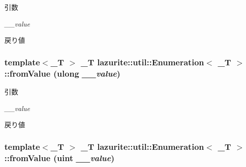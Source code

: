 \begin{DoxyParams}{引数}
\item[{\em \_\-\_\-value}]\end{DoxyParams}
\begin{DoxyReturn}{戻り値}

\end{DoxyReturn}
\hypertarget{classlazurite_1_1util_1_1_enumeration_3_01___t_01_4_a3032515b693fa3804c848efd7fea3cd7}{
\subsubsection[{fromValue}]{\setlength{\rightskip}{0pt plus 5cm}template$<$\_\-T $>$ \_\-T lazurite::util::Enumeration$<$ \_\-T $>$::fromValue (ulong {\em \_\-\_\-value})}}
\label{classlazurite_1_1util_1_1_enumeration_3_01___t_01_4_a3032515b693fa3804c848efd7fea3cd7}

\begin{DoxyParams}{引数}
\item[{\em \_\-\_\-value}]\end{DoxyParams}
\begin{DoxyReturn}{戻り値}

\end{DoxyReturn}
\hypertarget{classlazurite_1_1util_1_1_enumeration_3_01___t_01_4_aff6ca33e481c76dbae9783dd75d7ca8a}{
\subsubsection[{fromValue}]{\setlength{\rightskip}{0pt plus 5cm}template$<$\_\-T $>$ \_\-T lazurite::util::Enumeration$<$ \_\-T $>$::fromValue (uint {\em \_\-\_\-value})}}
\label{classlazurite_1_1util_1_1_enumeration_3_01___t_01_4_aff6ca33e481c76dbae9783dd75d7ca8a}

